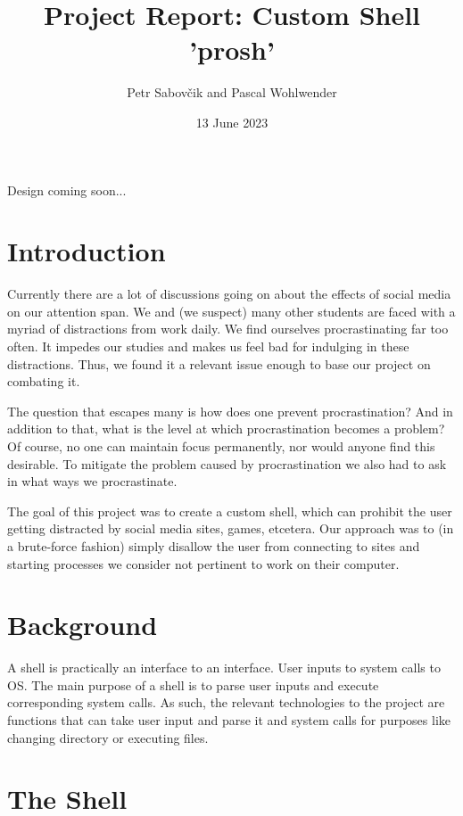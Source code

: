 \documentclass{article}
\title{Project Report: Custom Shell 'prosh'}
\date{13 June 2023}
\author{Petr Sabovčik and Pascal Wohlwender}
\begin{document}
\begin{titlepage}
	\maketitle
	Design coming soon...
\end{titlepage}

\tableofcontents
\pagebreak

\section{Introduction}

Currently there are a lot of discussions going on about the effects of social media on our attention span. We and (we suspect) many other students are faced with a myriad of distractions from work daily. We find ourselves procrastinating far too often. It impedes our studies and makes us feel bad for indulging in these distractions. Thus, we found it a relevant issue enough to base our project on combating it. 

The question that escapes many is how does one prevent procrastination? And in addition to that, what is the level at which procrastination becomes a problem? Of course, no one can maintain focus permanently, nor would anyone find this desirable. To mitigate the problem caused by procrastination we also had to ask in what ways we procrastinate. 

The goal of this project was to create a custom shell, which can prohibit the user getting distracted by social media sites, games, etcetera. Our approach was to (in a brute-force fashion) simply disallow the user from connecting to sites and starting processes we consider not pertinent to work on their computer. 


\section{Background}

A shell is practically an interface to an interface. User inputs to system calls to OS. The main purpose of a shell is to parse user inputs and execute corresponding system calls. As such, the relevant technologies to the project are functions that can take user input and parse it and system calls for purposes like changing directory or executing files.

\section{The Shell}
\end{document}
